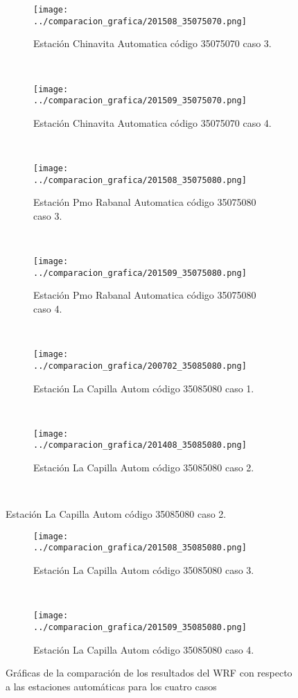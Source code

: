 \begin{figure}[H]
\centering
\begin{subfigure}[normla]{0.4\textwidth}
\caption{Estación Chinavita Automatica código 35075070 caso 3.}
\texttt{[image: ../comparacion\_grafica/201508\_35075070.png]}
\end{subfigure}
~
\begin{subfigure}[normla]{0.4\textwidth}
\caption{Estación Chinavita Automatica código 35075070 caso 4.}
\texttt{[image: ../comparacion\_grafica/201509\_35075070.png]}
\end{subfigure}
~
\begin{subfigure}[normla]{0.4\textwidth}
\caption{Estación Pmo Rabanal Automatica  código 35075080 caso 3.}
\texttt{[image: ../comparacion\_grafica/201508\_35075080.png]}
\end{subfigure}
~
\begin{subfigure}[normla]{0.4\textwidth}
\caption{Estación Pmo Rabanal Automatica  código 35075080 caso 4.}
\texttt{[image: ../comparacion\_grafica/201509\_35075080.png]}
\end{subfigure}
~
\begin{subfigure}[normla]{0.4\textwidth}
\caption{Estación La Capilla Autom código 35085080 caso 1.}
\texttt{[image: ../comparacion\_grafica/200702\_35085080.png]}
\end{subfigure}
~
\begin{subfigure}[normla]{0.4\textwidth}
\caption{Estación La Capilla Autom código 35085080 caso 2.}
\texttt{[image: ../comparacion\_grafica/201408\_35085080.png]}
\end{subfigure}
~
\end{figure}
           
\begin{figure}[H]\ContinuedFloat
\centering
\begin{subfigure}[normla]{0.4\textwidth}
\caption{Estación La Capilla Autom código 35085080 caso 3.}
\texttt{[image: ../comparacion\_grafica/201508\_35085080.png]}
\end{subfigure}
~
\begin{subfigure}[normla]{0.4\textwidth}
\caption{Estación La Capilla Autom código 35085080 caso 4.}
\texttt{[image: ../comparacion\_grafica/201509\_35085080.png]}
\end{subfigure}

    
    \caption{Gráficas de la comparación de los resultados del WRF con respecto a las estaciones automáticas para los cuatro casos}
    \label{fig:my_label}
\end{figure}